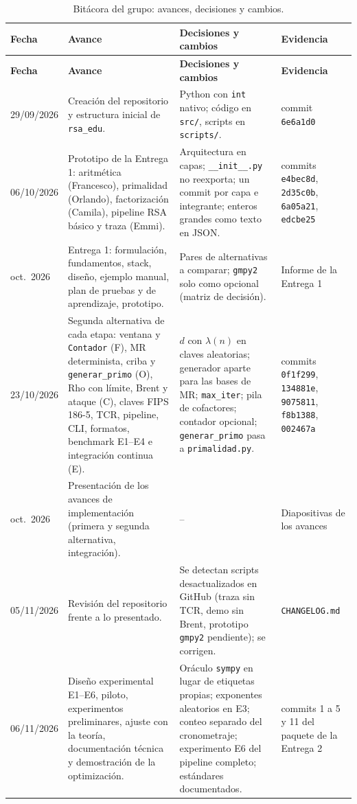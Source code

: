 \begin{longtable}{@{}p{1.9cm} p{5.3cm} p{5.0cm} p{2.4cm}@{}}
\caption{Bitácora del grupo: avances, decisiones y cambios.}\label{tab:bitacora}\\
\toprule
\textbf{Fecha} & \textbf{Avance} & \textbf{Decisiones y cambios} & \textbf{Evidencia}\\
\midrule
\endfirsthead
\toprule
\textbf{Fecha} & \textbf{Avance} & \textbf{Decisiones y cambios} & \textbf{Evidencia}\\
\midrule
\endhead
29/09/2026 & Creación del repositorio y estructura inicial de \texttt{rsa\_edu}. & Python con \texttt{int} nativo; código en \texttt{src/}, scripts en \texttt{scripts/}. & commit \texttt{6e6a1d0}\\
06/10/2026 & Prototipo de la Entrega 1: aritmética (Francesco), primalidad (Orlando), factorización (Camila), pipeline RSA básico y traza (Emmi). & Arquitectura en capas; \texttt{\_\_init\_\_.py} no reexporta; un commit por capa e integrante; enteros grandes como texto en JSON. & commits \texttt{e4bec8d}, \texttt{2d35c0b}, \texttt{6a05a21}, \texttt{edcbe25}\\
oct.\ 2026 & Entrega 1: formulación, fundamentos, stack, diseño, ejemplo manual, plan de pruebas y de aprendizaje, prototipo. & Pares de alternativas a comparar; \texttt{gmpy2} solo como opcional (matriz de decisión). & Informe de la Entrega 1\\
23/10/2026 & Segunda alternativa de cada etapa: ventana y \texttt{Contador} (F), MR determinista, criba y \texttt{generar\_primo} (O), Rho con límite, Brent y ataque (C), claves FIPS 186-5, TCR, pipeline, CLI, formatos, benchmark E1--E4 e integración continua (E). & $d$ con $\lambda(n)$ en claves aleatorias; generador aparte para las bases de MR; \texttt{max\_iter}; pila de cofactores; contador opcional; \texttt{generar\_primo} pasa a \texttt{primalidad.py}. & commits \texttt{0f1f299}, \texttt{134881e}, \texttt{9075811}, \texttt{f8b1388}, \texttt{002467a}\\
oct.\ 2026 & Presentación de los avances de implementación (primera y segunda alternativa, integración). & -- & Diapositivas de los avances\\
05/11/2026 & Revisión del repositorio frente a lo presentado. & Se detectan scripts desactualizados en GitHub (traza sin TCR, demo sin Brent, prototipo \texttt{gmpy2} pendiente); se corrigen. & {\footnotesize\texttt{CHANGELOG.md}}\\
06/11/2026 & Diseño experimental E1--E6, piloto, experimentos preliminares, ajuste con la teoría, documentación técnica y demostración de la optimización. & Oráculo \texttt{sympy} en lugar de etiquetas propias; exponentes aleatorios en E3; conteo separado del cronometraje; experimento E6 del pipeline completo; estándares documentados. & commits 1 a 5 y 11 del paquete de la Entrega 2\\

\end{longtable}
